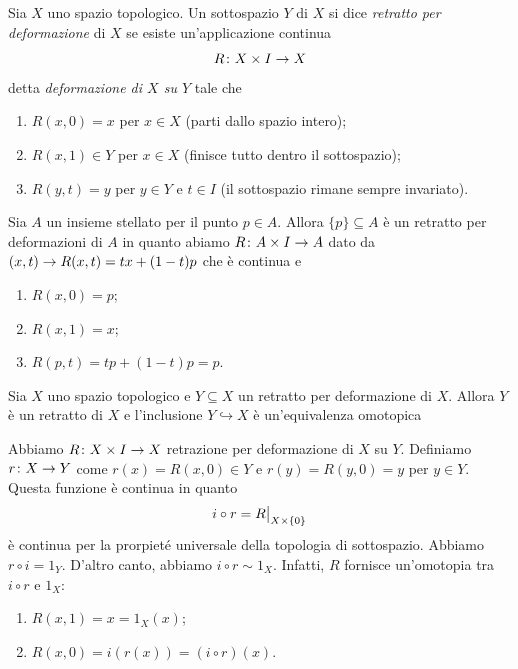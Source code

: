 \documentclass[a4paper]{article}
\begin{document}
\begin{snippetdefinition}{}
    Sia \(X\) uno spazio topologico. Un sottospazio \(Y\)
    di \(X\) si dice \emph{retratto per deformazione} di \(X\)
    se esiste un'applicazione continua
    \[
        R \colon X \times I \to X
    \]
    detta \emph{deformazione di \(X\) su \(Y\)} tale che
    \begin{enumerate}
        \item \(R(x, 0) = x\) per \(x \in X\) (parti dallo spazio intero);
        \item \(R(x, 1) \in Y\) per \(x \in X\) (finisce tutto dentro il sottospazio);
        \item \(R(y, t) = y\) per \(y \in Y\) e \(t\in I\) (il sottospazio rimane sempre invariato).
    \end{enumerate}
\end{snippetdefinition}

\begin{snippetexample}{}
    Sia \(A\) un insieme stellato per il punto \(p \in A\).
    Allora \(\{p\} \subseteq A\) è un retratto per deformazioni di \(A\)
    in quanto abiamo \(R \colon A \times I \to A\)
    dato da \((x,t) \to R(x, t) = tx + (1-t)p\)
    che è continua e
    \begin{enumerate}
        \item \(R(x,0) = p\);
        \item \(R(x,1) = x\);
        \item \(R(p, t) = tp + (1-t)p = p\).
    \end{enumerate}
\end{snippetexample}

\begin{snippetproposition}{}
    Sia \(X\) uno spazio topologico e \(Y \subseteq X\)
    un retratto per deformazione di \(X\).
    Allora \(Y\) è un retratto di \(X\)
    e l'inclusione \(Y \hookrightarrow X\)
    è un'equivalenza omotopica 
\end{snippetproposition}

\begin{snippetproof}{}
    Abbiamo \(R \colon X \times I \to X\) retrazione per deformazione di \(X\) su \(Y\).
    Definiamo \(r \colon X \to Y\) come
    \(r(x) = R(x,0)\in Y\) e \(r(y) = R(y,0) = y\)
    per \(y \in Y\).
    Questa funzione è continua in quanto
    \[
        i \circ r = \restr{R}{X \times \{0\}}
    \]
    è continua per la prorpieté universale della topologia di sottospazio.
    Abbiamo \(r \circ i = 1_Y\).
    D'altro canto, abbiamo \(i \circ r \sim 1_X\).
    Infatti, \(R\) fornisce un'omotopia tra \(i \circ r\) e \(1_X\):
    \begin{enumerate}
        \item \(R(x, 1) = x = 1_X(x)\);
        \item \(R(x,0) = i(r(x)) = (i \circ r)(x)\).
    \end{enumerate}
\end{snippetproof}
\end{document}
